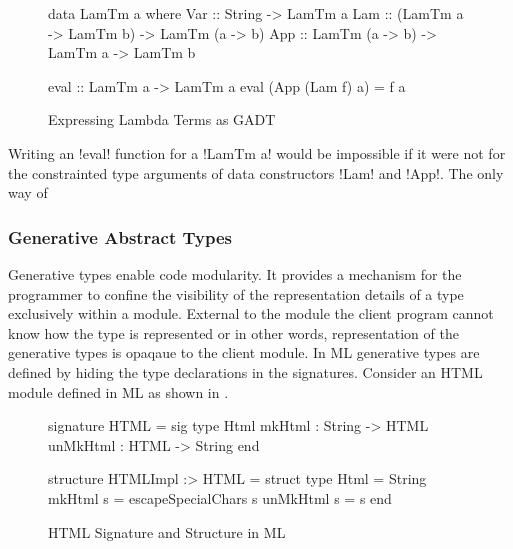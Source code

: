 \documentclass[manuscript,screen,nonacm]{acmart}
\begin{document}
\begin{figure}[ht]
  \centering
  \begin{minipage}[ht]{0.5\linewidth}
    \begin{code}
data LamTm a where
  Var :: String -> LamTm a
  Lam :: (LamTm a -> LamTm b) -> LamTm (a -> b)
  App :: LamTm (a -> b) -> LamTm a -> LamTm b
    \end{code}
  \end{minipage}%
  \begin{minipage}[ht]{0.5\linewidth}
    \begin{code}
      eval :: LamTm a -> LamTm a
      eval (App (Lam f) a) = f a

      
    \end{code}
  \end{minipage}
  \caption{Expressing Lambda Terms as GADT}
  \label{fig:gadt-example}
\end{figure}
Writing an !eval! function for a !LamTm a! would be impossible if it were not for the constrainted type arguments of data constructors !Lam! and !App!. The only way of 

\subsubsection{Generative Abstract Types}
Generative types enable code modularity. It provides a mechanism for the programmer to confine the visibility of the representation details of a type exclusively within a module. External to the module the client program cannot know how the type is represented or in other words, representation of the generative types is opaqaue to the client module. In ML generative types are defined by hiding the type declarations in the signatures. Consider an HTML module defined in ML as shown in .

\begin{figure}[ht]
  \centering
  \begin{minipage}[ht]{0.4\linewidth}
    \begin{code}
      signature HTML = sig
          type Html
          mkHtml : String -> HTML
          unMkHtml : HTML -> String
      end
    \end{code}
  \end{minipage}%
  \begin{minipage}[ht]{0.4\linewidth}
    \begin{code}
      structure HTMLImpl :> HTML = struct
          type Html = String
          mkHtml s = escapeSpecialChars s
          unMkHtml s = s
      end
    \end{code}
  \end{minipage}
  \caption{HTML Signature and Structure in ML}
  \label{fig:ml-generative-type}
\end{figure}
\end{document}
